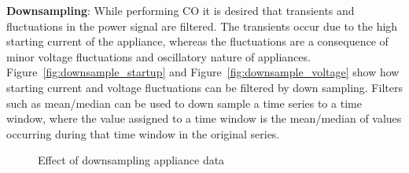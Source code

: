 \documentclass[conference]{IEEEtran}
\newcommand{\figref}[1]{Figure~\ref{#1}}
\begin{document}
\noindent\textbf{Downsampling}: While performing CO it is desired that transients and fluctuations in the power signal are filtered\cite{hart}. The transients occur due to the high starting current of the appliance, whereas the fluctuations are a consequence of minor voltage fluctuations and oscillatory nature of appliances. \figref{fig:downsample_startup} and \figref{fig:downsample_voltage} show how starting current and voltage fluctuations can be filtered by down sampling. Filters such as mean/median can be used to down sample a time series to a time window, where the value assigned to a time window is the mean/median of values occurring during that time window in the original series.

\begin{figure} 
	
    \hspace{1pt}
    \vspace{-8pt}
  	\caption{Effect of downsampling appliance data}
  	\vspace{-20pt}
    \label{fig:downsampling}
\end{figure}
\end{document}
